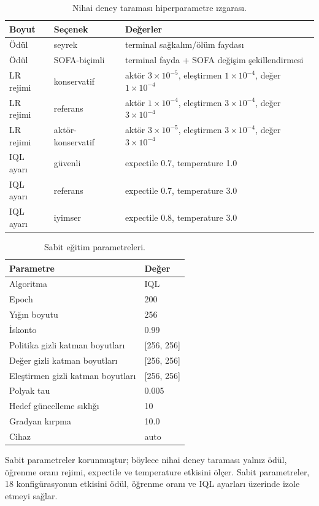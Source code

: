 \documentclass[conference]{IEEEtran}
\begin{document}
\begin{table}[t]
\centering
\caption{Nihai deney taraması hiperparametre ızgarası.}
\label{tab:grid_full}
\begin{tabular}{lll}
\toprule
Boyut & Seçenek & Değerler \\
\midrule
Ödül & seyrek & terminal sağkalım/ölüm faydası \\
Ödül & SOFA-biçimli & terminal fayda + SOFA değişim şekillendirmesi \\
LR rejimi & konservatif & aktör $3\times10^{-5}$, eleştirmen $1\times10^{-4}$, değer $1\times10^{-4}$ \\
LR rejimi & referans & aktör $1\times10^{-4}$, eleştirmen $3\times10^{-4}$, değer $3\times10^{-4}$ \\
LR rejimi & aktör-konservatif & aktör $3\times10^{-5}$, eleştirmen $3\times10^{-4}$, değer $3\times10^{-4}$ \\
IQL ayarı & güvenli & expectile 0.7, temperature 1.0 \\
IQL ayarı & referans & expectile 0.7, temperature 3.0 \\
IQL ayarı & iyimser & expectile 0.8, temperature 3.0 \\
\bottomrule
\end{tabular}
\end{table}

\begin{table}[t]
\centering
\caption{Sabit eğitim parametreleri.}
\label{tab:fixed_params}
\begin{tabular}{ll}
\toprule
Parametre & Değer \\
\midrule
Algoritma & IQL \\
Epoch & 200 \\
Yığın boyutu & 256 \\
İskonto & 0.99 \\
Politika gizli katman boyutları & [256, 256] \\
Değer gizli katman boyutları & [256, 256] \\
Eleştirmen gizli katman boyutları & [256, 256] \\
Polyak tau & 0.005 \\
Hedef güncelleme sıklığı & 10 \\
Gradyan kırpma & 10.0 \\
Cihaz & auto \\
\bottomrule
\end{tabular}
\end{table}

Sabit parametreler korunmuştur; böylece nihai deney taraması yalnız ödül, öğrenme oranı rejimi, expectile ve temperature etkisini ölçer. Sabit parametreler, 18 konfigürasyonun etkisini ödül, öğrenme oranı ve IQL ayarları üzerinde izole etmeyi sağlar.
\end{document}
